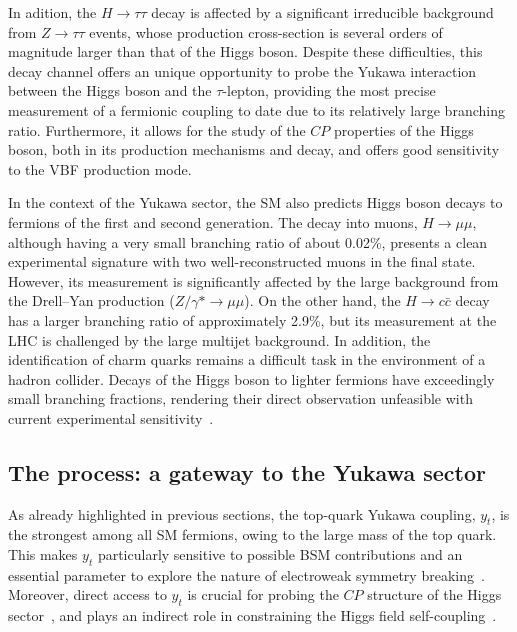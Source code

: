In adition, the $H \rightarrow \tau\tau$ decay is affected by a significant irreducible background from $Z \rightarrow \tau\tau$ events, whose production cross-section is several orders of magnitude larger than that of the Higgs boson. Despite these difficulties, this decay channel offers an unique opportunity to probe the Yukawa interaction between the Higgs boson and the $\tau$-lepton, providing the most precise measurement of a fermionic coupling to date due to its relatively large branching ratio. Furthermore, it allows for the study of the $CP$ properties of the Higgs boson, both in its production mechanisms and decay, and offers good sensitivity to the VBF production mode.

In the context of the Yukawa sector, the SM also predicts Higgs boson decays to fermions of the first and second generation. The decay into muons, \( H \rightarrow \mu\mu \), although having a very small branching ratio of about 0.02\%, presents a clean experimental signature with two well-reconstructed muons in the final state. However, its measurement is significantly affected by the large background from the Drell--Yan production ($Z/\gamma* \to \mu \mu$). On the other hand, the \( H \rightarrow c\bar{c} \) decay has a larger branching ratio of approximately 2.9\%, but its measurement at the LHC is challenged by the large multijet background. In addition, the identification of charm quarks remains a difficult task in the environment of a hadron collider. Decays of the Higgs boson to lighter fermions have exceedingly small branching fractions, rendering their direct observation unfeasible with current experimental sensitivity~\cite{https://doi.org/10.23731/cyrm-2017-002}.

\subsection{The \ttH process: a gateway to the Yukawa sector}
\label{sec:ttH}
As already highlighted in previous sections, the top-quark Yukawa coupling, $y_t$, is the strongest among all SM fermions, owing to the large mass of the top quark. This makes $y_t$ particularly sensitive to possible BSM contributions and an essential parameter to explore the nature of electroweak symmetry breaking~\cite{Englert:2014uua,Dobrescu:1997nm,Chivukula:1998wd,Delepine:1995qs}. Moreover, direct access to $y_t$ is crucial for probing the $CP$ structure of the Higgs sector~\cite{Bernreuther:2002uj,Brod:2013cka}, and plays an indirect role in constraining the Higgs field self-coupling~\cite{Buttazzo:2013uya,Degrassi:2016wml}.

